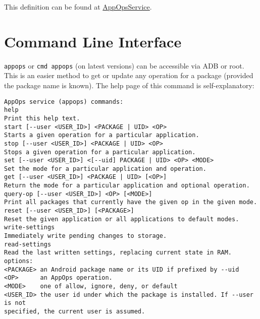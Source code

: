This definition can be found at
\href{https://android.googlesource.com/platform/frameworks/base/+/master/services/core/java/com/android/server/appop/AppOpsService.java}{AppOpsService}.


\section{Command Line Interface}\label{sec:appops-cli}
\texttt{appops} or \texttt{cmd appops} (on latest versions) can be accessible via ADB or root. This is an easier method
to get or update any operation for a package (provided the package name is known). The help page of this command is
self-explanatory:
\begin{Verbatim}
AppOps service (appops) commands:
help
Print this help text.
start [--user <USER_ID>] <PACKAGE | UID> <OP>
Starts a given operation for a particular application.
stop [--user <USER_ID>] <PACKAGE | UID> <OP>
Stops a given operation for a particular application.
set [--user <USER_ID>] <[--uid] PACKAGE | UID> <OP> <MODE>
Set the mode for a particular application and operation.
get [--user <USER_ID>] <PACKAGE | UID> [<OP>]
Return the mode for a particular application and optional operation.
query-op [--user <USER_ID>] <OP> [<MODE>]
Print all packages that currently have the given op in the given mode.
reset [--user <USER_ID>] [<PACKAGE>]
Reset the given application or all applications to default modes.
write-settings
Immediately write pending changes to storage.
read-settings
Read the last written settings, replacing current state in RAM.
options:
<PACKAGE> an Android package name or its UID if prefixed by --uid
<OP>      an AppOps operation.
<MODE>    one of allow, ignore, deny, or default
<USER_ID> the user id under which the package is installed. If --user is not
specified, the current user is assumed.
\end{Verbatim}
